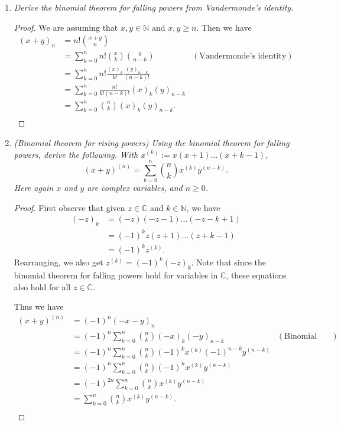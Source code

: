 \documentclass{article}
\begin{document}
\begin{enumerate}[label={\bf Q\arabic*:}]
  \item \it Derive the binomial theorem for falling powers from
    Vandermonde's identity.

    \begin{proof}
      We are assuming that $x,y\in\mathbb{N}$ and $x,y\geq n$. Then we have
      \begin{align*}
        (x+y)_n &=n!\binom{x+y}{n} \\
        &=\sum_{k=0}^nn!\binom{x}{k}\binom{y}{n-k} &(\text{Vandermonde's
          identity}) \\
        &=\sum_{k=0}^nn!\frac{(x)_k}{k!}\frac{(y)_{n-k}}{(n-k)!} \\
        &=\sum_{k=0}^n\frac{n!}{k!(n-k)!}(x)_k(y)_{n-k} \\
        &=\sum_{k=0}^n\binom{n}{k}(x)_k(y)_{n-k}. \\
      \end{align*}
    \end{proof}

  \item \it (Binomial theorem for rising powers) Using the binomial theorem
    for falling powers, derive the following. With
    $x^{(k)}:=x(x+1)\ldots(x+k-1)$,
    \[(x+y)^{(n)} =\sum_{k=0}^n\binom{n}{k}x^{(k)}y^{(n-k)}.\]
    Here again $x$ and $y$ are complex variables, and $n\geq0$.

    \begin{proof}
      First observe that given $z\in\mathbb{C}$ and $k\in\mathbb{N}$, we
      have
      \begin{align*}
        (-z)_{k} &=(-z)(-z-1)\ldots(-z-k+1) \\
        &=(-1)^kz(z+1)\ldots(z+k-1) \\
        &=(-1)^kz^{(k)}.
      \end{align*}
      Rearranging, we also get $z^{(k)}=(-1)^k(-z)_k$.  Note that since the
      binomial theorem for falling powers hold for variables in
      $\mathbb{C}$, these equations also hold for all $z\in\mathbb{C}$.

      Thus we have
      \begin{align*}
        (x+y)^{(n)} &=(-1)^n(-x-y)_{n} \\
        &=(-1)^n \sum_{k=0}^{n} \binom{n}{k}(-x)_{k}(-y)_{n-k}
          &(\text{Binomial theorem for falling powers}) \\
        &=(-1)^n \sum_{k=0}^{n} \binom{n}{k} (-1)^kx^{(k)}
          (-1)^{n-k}y^{(n-k)} \\
        &=(-1)^n \sum_{k=0}^{n} \binom{n}{k} (-1)^nx^{(k)} y^{(n-k)} \\
        &=(-1)^{2n} \sum_{k=0}^{n} \binom{n}{k} x^{(k)} y^{(n-k)} \\
        &=\sum_{k=0}^{n} \binom{n}{k} x^{(k)} y^{(n-k)}. \\
      \end{align*}
    \end{proof}


\end{enumerate}
\end{document}
